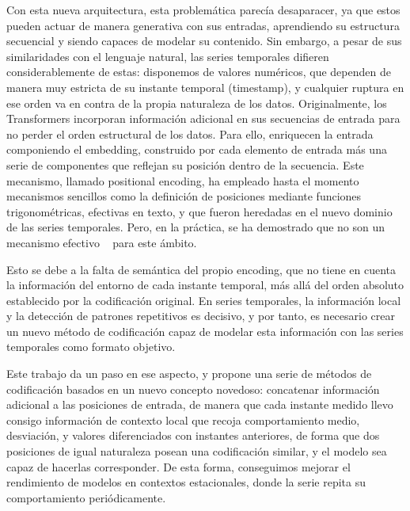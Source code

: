 Con esta nueva arquitectura, esta problemática parecía desaparacer, ya que estos pueden actuar de manera generativa con sus entradas, aprendiendo su estructura secuencial y siendo capaces de modelar su contenido. Sin embargo, a pesar de sus similaridades con el lenguaje natural, las series temporales difieren considerablemente de estas: disponemos de valores numéricos, que dependen de manera muy estricta de su instante temporal (timestamp), y cualquier ruptura en ese orden va en contra de la propia naturaleza de los datos.
Originalmente, los Transformers incorporan información adicional en sus secuencias de entrada para no perder el orden estructural de los datos. Para ello, enriquecen la entrada componiendo el embedding, construido por cada elemento de entrada más una serie de componentes que reflejan su posición dentro de la secuencia. Este mecanismo, llamado positional encoding, ha empleado hasta el momento mecanismos sencillos como la definición de posiciones mediante funciones trigonométricas, efectivas en texto, y que fueron heredadas en el nuevo dominio de las series temporales. Pero, en la práctica, se ha demostrado que no son un mecanismo efectivo ~\cite{zeng2022transformerseffectivetimeseries} para este ámbito.\vspace{0.35em}

Esto se debe a la falta de semántica del propio encoding, que no tiene en cuenta la información del entorno de cada instante temporal, más allá del orden absoluto establecido por la codificación original. En series temporales, la información local y la detección de patrones repetitivos es decisivo, y por tanto, es necesario crear un nuevo método de codificación capaz de modelar esta información con las series temporales como formato objetivo.\vspace{0.35em}

Este trabajo da un paso en ese aspecto, y propone una serie de métodos de codificación basados en un nuevo concepto novedoso: concatenar información adicional a las posiciones de entrada, de manera que cada instante medido llevo consigo información de contexto local que recoja comportamiento medio, desviación, y valores diferenciados con instantes anteriores, de forma que dos posiciones de igual naturaleza posean una codificación similar, y el modelo sea capaz de hacerlas corresponder. De esta forma, conseguimos mejorar el rendimiento de modelos en contextos estacionales, donde la serie repita su comportamiento periódicamente.\vspace{0.35em}

